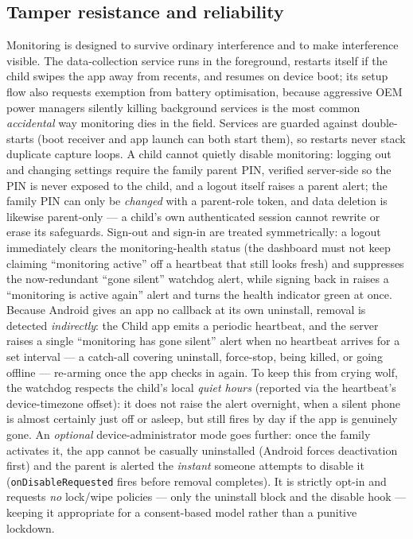 \documentclass[11pt,a4paper]{article}
\begin{document}
\subsection{Tamper resistance and reliability}
Monitoring is designed to survive ordinary interference and to make interference
visible. The data-collection service runs in the foreground, restarts itself if the
child swipes the app away from recents, and resumes on device boot; its setup flow also
requests exemption from battery optimisation, because aggressive OEM power managers
silently killing background services is the most common \emph{accidental} way monitoring
dies in the field. Services are guarded against double-starts (boot receiver and app
launch can both start them), so restarts never stack duplicate capture loops. A child
cannot quietly disable monitoring: logging out and changing settings require the family
parent PIN, verified server-side so the PIN is never exposed to the child, and a logout
itself raises a parent alert; the family PIN can only be \emph{changed} with a
parent-role token, and data deletion is likewise parent-only --- a child's own
authenticated session cannot rewrite or erase its safeguards. Sign-out and sign-in are
treated symmetrically: a logout immediately clears the monitoring-health
status (the dashboard must not keep claiming ``monitoring active'' off a heartbeat that
still looks fresh) and suppresses the now-redundant ``gone silent'' watchdog alert,
while signing back in raises a ``monitoring is active again'' alert and turns the
health indicator green at once. Because Android gives an app no callback at its own uninstall,
removal is detected \emph{indirectly}: the Child app emits a periodic heartbeat, and the
server raises a single ``monitoring has gone silent'' alert when no heartbeat arrives for
a set interval --- a catch-all covering uninstall, force-stop, being killed, or going
offline --- re-arming once the app checks in again. To keep this from crying wolf, the
watchdog respects the child's local \emph{quiet hours} (reported via the heartbeat's
device-timezone offset): it does not raise the alert overnight, when a silent phone is
almost certainly just off or asleep, but still fires by day if the app is genuinely gone.
An \emph{optional} device-administrator mode goes further: once the family activates it,
the app cannot be casually uninstalled (Android forces deactivation first) and the parent
is alerted the \emph{instant} someone attempts to disable it (\texttt{onDisableRequested}
fires before removal completes). It is strictly opt-in and requests \emph{no} lock/wipe
policies --- only the uninstall block and the disable hook --- keeping it appropriate for
a consent-based model rather than a punitive lockdown.
\end{document}
